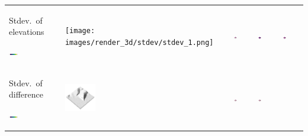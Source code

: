 \documentclass[prodmode,acmtochi]{acmsmall} %
\begin{document}
\begin{table}
{\begin{tabular}{m{} m{} m{} m{} m{}}
%
Stdev.~of elevations \par \vspace{0.5em} \includegraphics[width=0.19\textwidth]{images/legends/stdev_legend.pdf} & 
\texttt{[image: images/render\_3d/stdev/stdev\_1.png]} &
\includegraphics[width=0.19\textwidth]{images/render_3d/stdev/stdev_dem_1.png} &
\includegraphics[width=0.19\textwidth]{images/render_3d/stdev/stdev_dem_2.png} &
\includegraphics[width=0.19\textwidth]{images/render_3d/stdev/stdev_dem_3.png}\\
%
Stdev.~of difference \par \vspace{0.5em} \includegraphics[width=0.19\textwidth]{images/legends/stdev_diff_legend.pdf} & 
\includegraphics[width=0.19\textwidth]{images/render_3d/stdev/stdev_ref_1.png} &
\includegraphics[width=0.19\textwidth]{images/render_3d/stdev/stdev_regression_difference_series_1.png} &
\includegraphics[width=0.19\textwidth]{images/render_3d/stdev/stdev_regression_difference_series_2.png} &

\end{tabular}}
\end{table}
\end{document}
